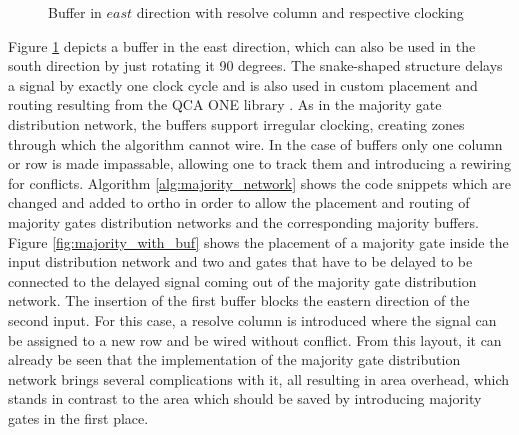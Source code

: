 \begin{figure}
	\caption{Buffer in $east$ direction with resolve column and respective clocking}\label{fig:QCA_buf}
\end{figure}

Figure \ref{fig:QCA_buf} depicts a buffer in the east direction, which can also be used in the south direction by just rotating it 90 degrees. The snake-shaped structure delays a signal by exactly one clock cycle and is also used in custom placement and routing resulting from the QCA ONE library \cite{QCA_scl}. As in the majority gate distribution network, the buffers support irregular clocking, creating zones through which the algorithm cannot wire. In the case of buffers only one column or row is made impassable, allowing one to track them and introducing a rewiring for conflicts. Algorithm \ref{alg:majority_network} shows the code snippets which are changed and added to ortho in order to allow the placement and routing of majority gates distribution networks and the corresponding majority buffers. Figure \ref{fig:majority_with_buf} shows the placement of a majority gate inside the input distribution network and two and gates that have to be delayed to be connected to the delayed signal coming out of the majority gate distribution network. The insertion of the first buffer blocks the eastern direction of the second input. For this case, a resolve column is introduced where the signal can be assigned to a new row and be wired without conflict. From this layout, it can already be seen that the implementation of the majority gate distribution network brings several complications with it, all resulting in area overhead, which stands in contrast to the area which should be saved by introducing majority gates in the first place.

